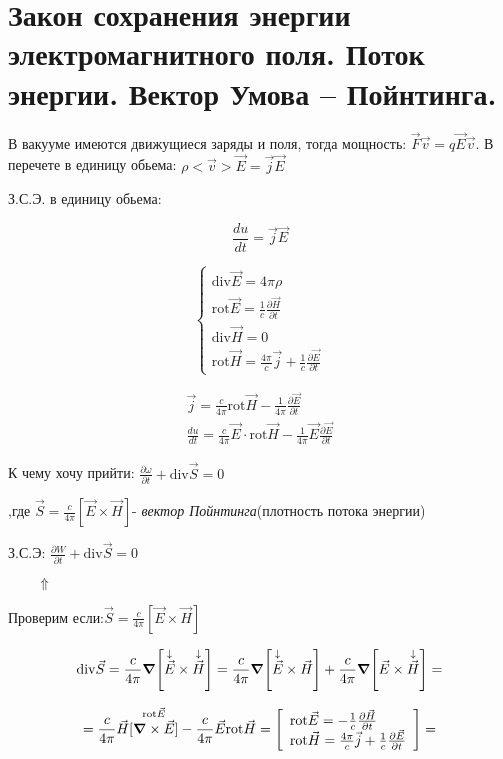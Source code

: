 \section{Закон сохранения энергии электромагнитного поля. Поток энергии. Вектор
Умова – Пойнтинга.}

В вакууме имеются движущиеся заряды и поля, тогда мощность: \( \vec{F}\vec{v}=q\vec{E}\vec{v} \). В перечете в единицу обьема: \( \rho <\vec{v}>\vec{E}=\vec{j}\vec{E} \) 

З.С.Э. в единицу обьема:

\[
\frac{du}{dt}=\vec{j}\vec{E}
\]

\[
\begin{cases}
    \mathrm{div}\vec{E}=4\pi\rho \\
    \mathrm{rot}\vec{E}=\frac{1}{c} \frac{\partial\vec{H}}{\partial t} \\
    \mathrm{div}\vec{H}=0 \\
    \mathrm{rot}\vec{H}=\frac{4\pi}{c}\vec{j}+\frac{1}{c} \frac{\partial\vec{E}}{\partial t}         
\end{cases}
\]

\begin{gather*}
    \vec{j}=\frac{c}{4\pi}\mathrm{rot}\vec{H}-\frac{1}{4\pi} \frac{\partial \vec{E}}{\partial t} \\
    \frac{du}{dt}=\frac{c}{4\pi}\vec{E}\cdot\mathrm{rot}\vec{H}-\frac{1}{4\pi}\vec{E}\frac{\partial\vec{E}}{\partial t}         
\end{gather*}

К чему хочу прийти: \( \frac{\partial\omega}{\partial t}+\mathrm{div}\vec{S}=0   \) 

,где \( \boxed{\vec{S}=\frac{c}{4\pi}[\vec{E}\times \vec{H}] } \)- \textit{вектор Пойнтинга}(плотность потока энергии)

З.С.Э: \( \frac{\partial W}{\partial t} +\mathrm{div}\vec{S}=0  \)

\(\qquad    \Uparrow\)

Проверим если:\(\vec{S}=\frac{c}{4\pi}[\vec{E}\times \vec{H}] \)

\[
\mathrm{div}\vec{S}=\frac{c}{4\pi}\grad [\overset{\downarrow}{\vec{E}}\times\overset{\downarrow}{\vec{H}} ]=\frac{c}{4\pi}\grad [\overset{\downarrow}{\vec{E}}\times \vec{H}]+\frac{c}{4\pi}\grad[\vec{E}\times \overset{\downarrow}{\vec{H}}]=     
\]

\[
=\frac{c}{4\pi}\vec{H}[\overset{\mathrm{rot}\vec{E} }{\grad \times \vec{E}}]-\frac{c}{4\pi}\vec{E} \mathrm{rot}\vec{H}=
\left[ 
    \begin{array}{ll}
        \mathrm{rot}\vec{E}=-\frac{1}{c}\frac{\partial\vec{H}}{\partial t} \\
        \mathrm{rot}\vec{H}=\frac{4\pi}{c}\vec{j}+\frac{1}{c}\frac{\partial\vec{E}}{\partial t}       
    \end{array} 
\right]=
\]

